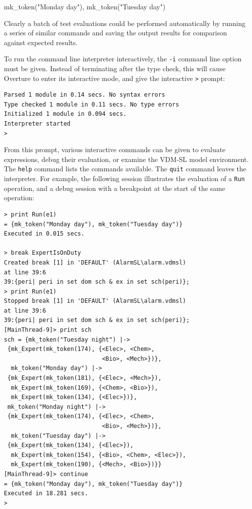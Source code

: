 \begin{vdmsl}
{mk_token("Monday day"), mk_token("Tuesday day")}
\end{vdmsl}

Clearly a batch of test evaluations could be performed automatically by running a series of similar commands and saving the output results for comparison against expected results.

To run the command line interpreter interactively, the \verb|-i| command line option must be given. Instead of terminating after the type check, this will cause Overture to enter its interactive mode, and
give the interactive \verb|>| prompt:

\begin{lstlisting}[style=tool]
Parsed 1 module in 0.14 secs. No syntax errors
Type checked 1 module in 0.11 secs. No type errors
Initialized 1 module in 0.094 secs. 
Interpreter started
>
\end{lstlisting}

\noindent From this prompt, various interactive commands can be given to evaluate expressions, debug their evaluation, or examine the VDM-SL model environment.  The \verb|help| command lists the commands
available. The \verb|quit| command leaves the interpreter. For example, the following session illustrates the evaluation of a \verb|Run| operation, and a debug session with a breakpoint at the start of the same operation:

\begin{minipage}{ \linewidth}
\begin{lstlisting}[style=tool]
> print Run(e1)
= {mk_token("Monday day"), mk_token("Tuesday day")}
Executed in 0.015 secs.

> break ExpertIsOnDuty
Created break [1] in 'DEFAULT' (AlarmSL\alarm.vdmsl) 
at line 39:6
39:{peri| peri in set dom sch & ex in set sch(peri)};
> print Run(e1)
Stopped break [1] in 'DEFAULT' (AlarmSL\alarm.vdmsl) 
at line 39:6
39:{peri| peri in set dom sch & ex in set sch(peri)};
[MainThread-9]> print sch
sch = {mk_token("Tuesday night") |->
 {mk_Expert(mk_token(174), {<Elec>, <Chem>, 
                            <Bio>, <Mech>})},
  mk_token("Monday day") |->
 {mk_Expert(mk_token(181), {<Elec>, <Mech>}),
  mk_Expert(mk_token(169), {<Chem>, <Bio>}),
  mk_Expert(mk_token(134), {<Elec>})},
 mk_token("Monday night") |->
 {mk_Expert(mk_token(174), {<Elec>, <Chem>, 
                            <Bio>, <Mech>})},
  mk_token("Tuesday day") |->
 {mk_Expert(mk_token(134), {<Elec>}),
  mk_Expert(mk_token(154), {<Bio>, <Chem>, <Elec>}),
  mk_Expert(mk_token(190), {<Mech>, <Bio>})}}
[MainThread-9]> continue
= {mk_token("Monday day"), mk_token("Tuesday day")}
Executed in 18.281 secs. 
> 
\end{lstlisting}
\end{minipage}


